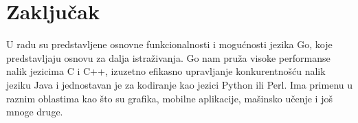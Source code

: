 \documentclass[a4paper]{article}
\begin{document}
\section{Zaključak}
\label{sec:zakljucak}
U radu su predstavljene osnovne funkcionalnosti i mogućnosti jezika Go, koje predstavljaju osnovu za dalja istraživanja. Go nam pruža visoke performanse nalik jezicima C i C++, izuzetno efikasno upravljanje konkurentnošću nalik jeziku Java i jednostavan je za kodiranje kao jezici Python ili Perl. Ima primenu u raznim oblastima kao što su grafika, mobilne aplikacije, mašinsko učenje i još mnoge druge.


\appendix
 


\appendix
\end{document}

